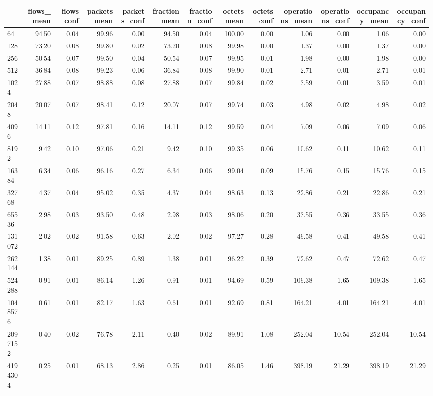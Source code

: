 \begin{tabular}{lrrrrrrrrrrrr}
\toprule
 & flows_mean & flows_conf & packets_mean & packets_conf & fraction_mean & fraction_conf & octets_mean & octets_conf & operations_mean & operations_conf & occupancy_mean & occupancy_conf \\
\midrule
64 & 94.50 & 0.04 & 99.96 & 0.00 & 94.50 & 0.04 & 100.00 & 0.00 & 1.06 & 0.00 & 1.06 & 0.00 \\
128 & 73.20 & 0.08 & 99.80 & 0.02 & 73.20 & 0.08 & 99.98 & 0.00 & 1.37 & 0.00 & 1.37 & 0.00 \\
256 & 50.54 & 0.07 & 99.50 & 0.04 & 50.54 & 0.07 & 99.95 & 0.01 & 1.98 & 0.00 & 1.98 & 0.00 \\
512 & 36.84 & 0.08 & 99.23 & 0.06 & 36.84 & 0.08 & 99.90 & 0.01 & 2.71 & 0.01 & 2.71 & 0.01 \\
1024 & 27.88 & 0.07 & 98.88 & 0.08 & 27.88 & 0.07 & 99.84 & 0.02 & 3.59 & 0.01 & 3.59 & 0.01 \\
2048 & 20.07 & 0.07 & 98.41 & 0.12 & 20.07 & 0.07 & 99.74 & 0.03 & 4.98 & 0.02 & 4.98 & 0.02 \\
4096 & 14.11 & 0.12 & 97.81 & 0.16 & 14.11 & 0.12 & 99.59 & 0.04 & 7.09 & 0.06 & 7.09 & 0.06 \\
8192 & 9.42 & 0.10 & 97.06 & 0.21 & 9.42 & 0.10 & 99.35 & 0.06 & 10.62 & 0.11 & 10.62 & 0.11 \\
16384 & 6.34 & 0.06 & 96.16 & 0.27 & 6.34 & 0.06 & 99.04 & 0.09 & 15.76 & 0.15 & 15.76 & 0.15 \\
32768 & 4.37 & 0.04 & 95.02 & 0.35 & 4.37 & 0.04 & 98.63 & 0.13 & 22.86 & 0.21 & 22.86 & 0.21 \\
65536 & 2.98 & 0.03 & 93.50 & 0.48 & 2.98 & 0.03 & 98.06 & 0.20 & 33.55 & 0.36 & 33.55 & 0.36 \\
131072 & 2.02 & 0.02 & 91.58 & 0.63 & 2.02 & 0.02 & 97.27 & 0.28 & 49.58 & 0.41 & 49.58 & 0.41 \\
262144 & 1.38 & 0.01 & 89.25 & 0.89 & 1.38 & 0.01 & 96.22 & 0.39 & 72.62 & 0.47 & 72.62 & 0.47 \\
524288 & 0.91 & 0.01 & 86.14 & 1.26 & 0.91 & 0.01 & 94.69 & 0.59 & 109.38 & 1.65 & 109.38 & 1.65 \\
1048576 & 0.61 & 0.01 & 82.17 & 1.63 & 0.61 & 0.01 & 92.69 & 0.81 & 164.21 & 4.01 & 164.21 & 4.01 \\
2097152 & 0.40 & 0.02 & 76.78 & 2.11 & 0.40 & 0.02 & 89.91 & 1.08 & 252.04 & 10.54 & 252.04 & 10.54 \\
4194304 & 0.25 & 0.01 & 68.13 & 2.86 & 0.25 & 0.01 & 86.05 & 1.46 & 398.19 & 21.29 & 398.19 & 21.29 \\

\end{tabular}
